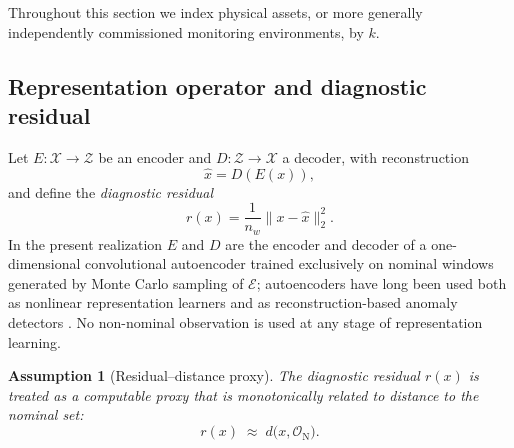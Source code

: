 \documentclass[a4paper]{cas-sc}
\newtheorem{assumption}{Assumption}
\newcommand{\X}{\ensuremath{\mathcal{X}}}
\newcommand{\Z}{\ensuremath{\mathcal{Z}}}
\newcommand{\EtaSpace}{\ensuremath{\mathcal{E}}}
\newcommand{\residual}{\ensuremath{r}}
\begin{document}
Throughout this section we index physical assets, or more generally
independently commissioned monitoring environments, by \(k\).

\subsection{Representation operator and diagnostic residual}
\label{subsec:representation_operator}

Let \(E:\X\rightarrow\Z\) be an encoder and \(D:\Z\rightarrow\X\) a
decoder, with reconstruction
\begin{equation}
\hat{x} = D(E(x)),
\label{eq:reconstruction}
\end{equation}
and define the \emph{diagnostic residual}
\begin{equation}
\residual(x) = \frac{1}{n_w}\bigl\|x-\hat{x}\bigr\|_2^2 .
\label{eq:residual}
\end{equation}
In the present realization \(E\) and \(D\) are the encoder and decoder of a
one-dimensional convolutional autoencoder trained exclusively on nominal
windows generated by Monte Carlo sampling of \(\EtaSpace\); autoencoders
have long been used both as nonlinear representation learners
\citep{hinton2006} and as reconstruction-based anomaly detectors
\citep{sakurada2014}. No non-nominal observation is used at any stage of
representation learning.

\begin{assumption}[Residual--distance proxy]
\label{ass:residual_proxy}
The diagnostic residual \(\residual(x)\) is treated as a computable proxy
that is monotonically related to distance to the nominal set:
\begin{equation}
\residual(x) \;\approx\; d\bigl(x,\mathcal{O}_{\mathrm N}\bigr).
\label{eq:distance_proxy}
\end{equation}
\end{assumption}
\end{document}
